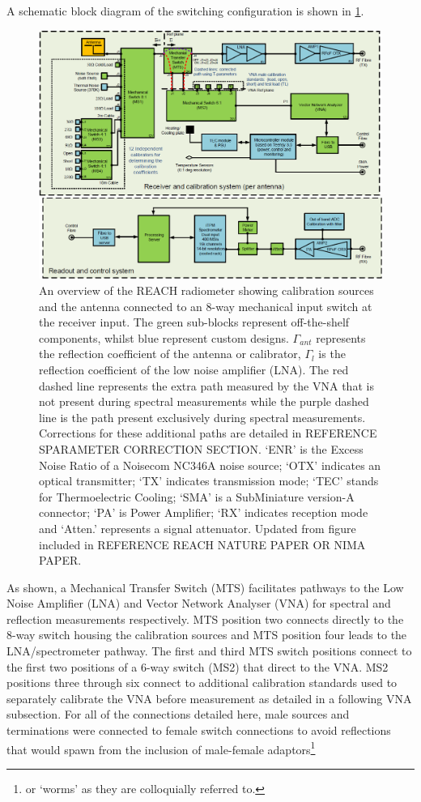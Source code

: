 A schematic block diagram of the switching configuration is shown in \cref{fig:overview}.
\begin{figure}
    \includegraphics[width=\columnwidth]{radiometer_v8a}
    \caption{An overview of the REACH radiometer showing calibration sources and the antenna connected to an 8-way mechanical input switch at the receiver input. The green sub-blocks represent off-the-shelf components, whilst blue represent custom designs. $\Gamma_{ant}$ represents the reflection coefficient of the antenna or calibrator, $\Gamma_{l}$ is the reflection coefficient of the low noise amplifier (LNA). The red dashed line represents the extra path measured by the VNA that is not present during spectral measurements while the purple dashed line is the path present exclusively during spectral measurements. Corrections for these additional paths are detailed in REFERENCE SPARAMETER CORRECTION SECTION. ‘ENR’ is the Excess Noise Ratio of a Noisecom NC346A noise source; ‘OTX’ indicates an optical transmitter; ‘TX’ indicates transmission mode; ‘TEC’ stands for Thermoelectric Cooling; ‘SMA’ is a SubMiniature version-A connector; ‘PA’ is Power Amplifier; ‘RX’ indicates reception mode and ‘Atten.’ represents a signal attenuator. Updated from figure included in REFERENCE REACH NATURE PAPER OR NIMA PAPER.}
    \label{fig:overview}
\end{figure}
As shown, a Mechanical Transfer Switch (MTS) facilitates pathways to the Low Noise Amplifier (LNA) and Vector Network Analyser (VNA) for spectral and reflection measurements respectively. MTS position two connects directly to the 8-way switch housing the calibration sources and MTS position four leads to the LNA/spectrometer pathway. The first and third MTS switch positions connect to the first two positions of a 6-way switch (MS2) that direct to the VNA. MS2 positions three through six connect to additional calibration standards used to separately calibrate the VNA before measurement as detailed in a following VNA subsection. For all of the connections detailed here, male sources and terminations were connected to female switch connections to avoid reflections that would spawn from the inclusion of male-female adaptors\footnote{or ‘worms’ as they are colloquially referred to.}

